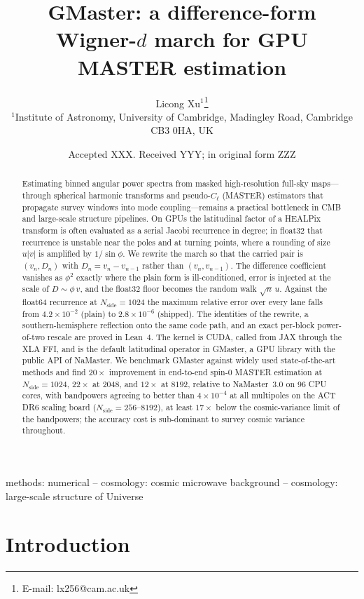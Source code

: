 \documentclass[letters,usenatbib,useAMS]{mnras}
\title[GMaster: difference-form GPU MASTER]{GMaster: a difference-form Wigner-$d$ march for GPU MASTER estimation}
\author[Xu]{
Licong Xu$^{1}$\thanks{E-mail: lx256@cam.ac.uk}\\
$^{1}$Institute of Astronomy, University of Cambridge, Madingley Road, Cambridge CB3 0HA, UK
}
\date{Accepted XXX. Received YYY; in original form ZZZ}
\begin{document}
\label{firstpage}
\pagerange{\pageref{firstpage}--\pageref{lastpage}}
\maketitle

\begin{abstract}
Estimating binned angular power spectra from masked high-resolution full-sky maps---through spherical harmonic transforms and pseudo-$C_\ell$ (MASTER) estimators that propagate survey windows into mode coupling---remains a practical bottleneck in CMB and large-scale structure pipelines. On GPUs the latitudinal factor of a HEALPix transform is often evaluated as a serial Jacobi recurrence in degree; in float32 that recurrence is unstable near the poles and at turning points, where a rounding of size $u\lvert v\rvert$ is amplified by $1/\sin\phi$. We rewrite the march so that the carried pair is $(v_n,D_n)$ with $D_n=v_n-v_{n-1}$ rather than $(v_n,v_{n-1})$. The difference coefficient vanishes as $\phi^2$ exactly where the plain form is ill-conditioned, error is injected at the scale of $D\sim\phi\,v$, and the float32 floor becomes the random walk $\sqrt{n}\,u$. Against the float64 recurrence at $N_{\mathrm{side}}=1024$ the maximum relative error over every lane falls from $4.2\times10^{-2}$ (plain) to $2.8\times10^{-6}$ (shipped). The identities of the rewrite, a southern-hemisphere reflection onto the same code path, and an exact per-block power-of-two rescale are proved in Lean~4. The kernel is CUDA, called from JAX through the XLA FFI, and is the default latitudinal operator in GMaster, a GPU library with the public API of NaMaster. We benchmark GMaster against widely used state-of-the-art methods and find $20\times$ improvement in end-to-end spin-$0$ MASTER estimation at $N_{\mathrm{side}}=1024$, $22\times$ at $2048$, and $12\times$ at $8192$, relative to NaMaster~3.0 on 96 CPU cores, with bandpowers agreeing to better than $4\times10^{-4}$ at all multipoles on the ACT DR6 scaling board ($N_{\mathrm{side}}=256$--$8192$), at least $17\times$ below the cosmic-variance limit of the bandpowers; the accuracy cost is sub-dominant to survey cosmic variance throughout.
\end{abstract}

\begin{keywords}
methods: numerical -- cosmology: cosmic microwave background -- cosmology: large-scale structure of Universe
\end{keywords}

\section{Introduction}
\end{document}
